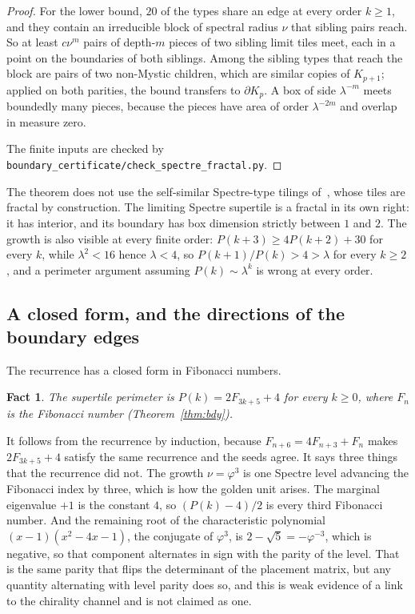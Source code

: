 \documentclass[11pt]{article}
\newtheorem{fact}{Fact}
\theoremstyle{definition}
\theoremstyle{remark}
\newcommand{\lam}{\lambda}
\newcommand{\code}[1]{\texttt{#1}}
\begin{document}
\begin{proof}
For the lower bound, $20$ of the types share an edge at every order $k\ge1$, and they contain an irreducible block of spectral
radius $\nu$ that sibling pairs reach.  So at least $c\nu^{m}$ pairs of depth-$m$ pieces of two sibling limit tiles meet,
each in a point on the boundaries of both siblings.  Among the sibling types that reach the block are pairs of two
non-Mystic children, which are similar copies of $K_{p+1}$; applied on both parities, the bound transfers to
$\partial K_{p}$.  A box of side $\lam^{-m}$ meets boundedly many pieces, because the pieces have area
of order $\lam^{-2m}$ and overlap in measure zero.

The finite inputs are checked by \code{boundary\_certificate/check\_spectre\_fractal.py}.
\end{proof}

\noindent
The theorem does not use the self-similar Spectre-type tilings of~\cite{BaakeSpectre}, whose tiles are fractal by
construction.  The limiting Spectre supertile is a fractal in its own right: it has interior, and its boundary has box
dimension strictly between $1$ and $2$.  The growth is also visible at every finite order: $P(k+3)\ge4P(k+2)+30$ for
every $k$, while $\lam^{2}<16$ hence $\lam<4$, so $P(k{+}1)/P(k)>4>\lam$ for every $k\ge2$, and a perimeter argument
assuming $P(k)\sim\lam^{k}$ is wrong at every order.


\subsection{A closed form, and the directions of the boundary edges}
\label{sec:bdyclosed}

The recurrence has a closed form in Fibonacci numbers.

\begin{fact}
\label{fact:bdyfib}
The supertile perimeter is $P(k)=2F_{3k+5}+4$ for every $k\ge0$, where $F_n$ is the Fibonacci
number (Theorem~\ref{thm:bdy}).
\end{fact}

\noindent
It follows from the recurrence by induction, because
$F_{n+6}=4F_{n+3}+F_{n}$ makes $2F_{3k+5}+4$ satisfy the same recurrence and the seeds
agree.  It says three things
that the recurrence did not.  The growth
$\nu=\varphi^{3}$ is one Spectre level advancing the Fibonacci index by three,
which is how the golden unit arises.  The marginal eigenvalue $+1$ is the
constant $4$, so $(P(k)-4)/2$ is every third Fibonacci number.  And the remaining
root of the characteristic polynomial $(x-1)(x^{2}-4x-1)$, the conjugate of $\varphi^{3}$, is $2-\sqrt5=-\varphi^{-3}$, which is negative, so that
component alternates in sign with the parity of the level.  That is the same
parity that flips the determinant of the placement matrix, but any quantity
alternating with level parity does so, and this is weak evidence of a link to
the chirality channel and is not claimed as one.
\end{document}
